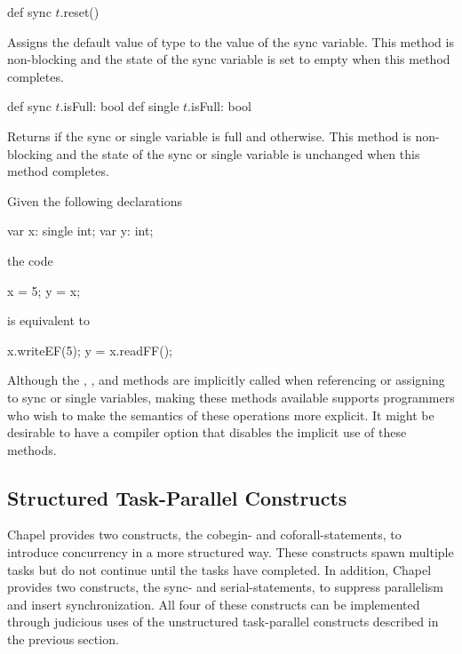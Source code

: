 \begin{protohead}
def sync $t$.reset()
\end{protohead}
\begin{protobody}
Assigns the default value of type  to the value of the sync
variable.  This method is non-blocking and the state of the sync
variable is set to empty when this method completes.
\end{protobody}

\begin{protohead}
def sync $t$.isFull: bool
def single $t$.isFull: bool
\end{protohead}
\begin{protobody}
Returns  if the sync or single variable is full and 
otherwise.  This method is non-blocking and the state of the sync or single
variable is unchanged when this method completes.
\end{protobody}

\begin{example}
Given the following declarations
\begin{chapel}
var x: single int;
var y: int;
\end{chapel}
the code
\begin{chapel}
x = 5;
y = x;
\end{chapel}
is equivalent to
\begin{chapel}
x.writeEF(5);
y = x.readFF();
\end{chapel}
\end{example}

\begin{rationale}
Although the , , and  methods
are implicitly called when referencing or assigning to sync or single
variables, making these methods available supports programmers who
wish to make the semantics of these operations more explicit.  It
might be desirable to have a compiler option that disables the
implicit use of these methods.
\end{rationale}

\subsection{Structured Task-Parallel Constructs}
\label{structured_task_parallelism}

Chapel provides two constructs, the cobegin- and coforall-statements,
to introduce concurrency in a more structured way.  These constructs
spawn multiple tasks but do not continue until the tasks have
completed.  In addition, Chapel provides two constructs, the sync- and
serial-statements, to suppress parallelism and insert synchronization.
All four of these constructs can be implemented through judicious uses
of the unstructured task-parallel constructs described in the previous
section.

